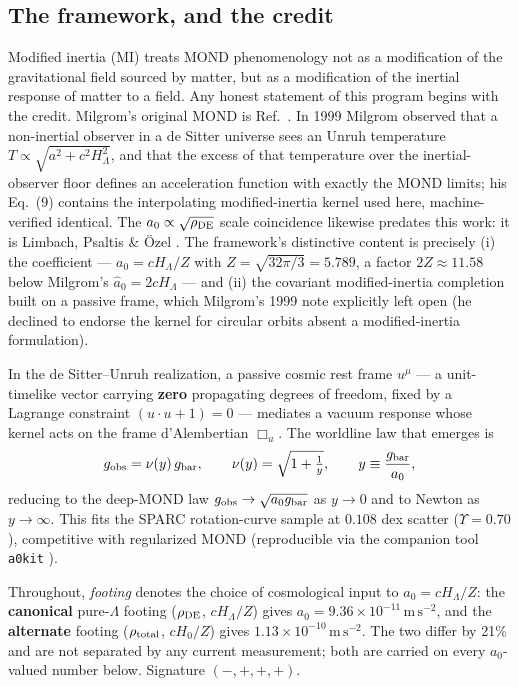 \documentclass[11pt]{article}
\newcommand{\ms}{\mathrm{m\,s^{-2}}}
\newcommand{\Boxu}{\Box_u}
\newcommand{\gbar}{g_{\rm bar}}
\newcommand{\gobs}{g_{\rm obs}}
\begin{document}
\subsection{The framework, and the credit}

Modified inertia (MI) treats MOND phenomenology not as a modification of the gravitational field sourced by matter, but as a modification of the inertial response of matter to a field. Any honest statement of this program begins with the credit. Milgrom's original MOND is Ref.~\cite{milgrom1983}. In 1999 Milgrom observed \cite{milgrom1999} that a non-inertial observer in a de Sitter universe sees an Unruh temperature $T\propto\sqrt{a^2+c^2H_\Lambda^2}$, and that the excess of that temperature over the inertial-observer floor defines an acceleration function with exactly the MOND limits; his Eq.~(9) contains the interpolating modified-inertia kernel used here, machine-verified identical. The $a_0\propto\sqrt{\rho_{\rm DE}}$ scale coincidence likewise predates this work: it is Limbach, Psaltis \& \"Ozel \cite{lpo2008}. The framework's distinctive content is precisely (i) the coefficient --- $a_0=cH_\Lambda/Z$ with $Z=\sqrt{32\pi/3}=5.789$, a factor $2Z\approx11.58$ below Milgrom's $\hat a_0=2cH_\Lambda$ --- and (ii) the covariant modified-inertia completion built on a passive frame, which Milgrom's 1999 note explicitly left open (he declined to endorse the kernel for circular orbits absent a modified-inertia formulation).

In the de Sitter--Unruh realization, a passive cosmic rest frame $u^\mu$ --- a unit-timelike vector carrying \textbf{zero} propagating degrees of freedom, fixed by a Lagrange constraint $(u\cdot u+1)=0$ --- mediates a vacuum response whose kernel acts on the frame d'Alembertian $\Boxu$. The worldline law that emerges is
\begin{equation}
\gobs=\nu(y)\,\gbar,\qquad \nu(y)=\sqrt{1+\tfrac1y},\qquad y\equiv\frac{\gbar}{a_0},
\label{eq:law}
\end{equation}
reducing to the deep-MOND law $\gobs\to\sqrt{a_0\gbar}$ as $y\to0$ and to Newton as $y\to\infty$. This fits the SPARC rotation-curve sample \cite{lelli2016} at $0.108$ dex scatter ($\Upsilon=0.70$), competitive with regularized MOND (reproducible via the companion tool \texttt{a0kit} \cite{a0kit}).

Throughout, \emph{footing} denotes the choice of cosmological input to $a_0=cH_\Lambda/Z$: the \textbf{canonical} pure-$\Lambda$ footing ($\rho_{\rm DE}$, $cH_\Lambda/Z$) gives $a_0=9.36\times10^{-11}\,\ms$, and the \textbf{alternate} footing ($\rho_{\rm total}$, $cH_0/Z$) gives $1.13\times10^{-10}\,\ms$. The two differ by 21\% and are not separated by any current measurement; both are carried on every $a_0$-valued number below. Signature $(-,+,+,+)$.
\end{document}
